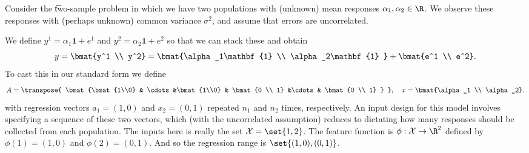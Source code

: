Consider the \t{two-sample problem} in which we have two populations with (unknown) mean responses $\alpha _1, \alpha _2 \in \R $.
We observe these responses with (perhaps unknown) common variance $\sigma ^2$, and assume that errors are uncorrelated.

We define $y^1 = \alpha _1\mathbf{1}  + e^1$ and $y^2 = \alpha _2\mathbf{1}  + e^2$ so that we can stack these and obtain
\[
y = \bmat{y^1 \\ y^2} = \bmat{\alpha _1\mathbf{1}  \\ \alpha _2\mathbf{1} } + \bmat{e^1 \\ e^2}.
\]
To cast this in our standard form we define
\[
A = \transpose{
\bmat{\bmat{1\\0} & \cdots &\bmat{1\\0} & \bmat{0 \\ 1} &\cdots & \bmat{0 \\ 1}
}
}, \quad x = \bmat{\alpha _1 \\ \alpha _2}.
\]
with regression vectors $a_1 = (1, 0)$ and $x_2 = (0, 1)$ repeated $n_1$ and $n_2$ times, respectively.
An input design for this model involves specifying a sequence of these two vectors, which (with the uncorrelated assumption) reduces to dictating how many responses should be collected from each population.
The inputs here is really the set $\mathcal{X}  = \set{1, 2}$.
The feature function is $\phi : \mathcal{X}  \to \R ^2$ defined by $\phi (1) = (1, 0)$ and $\phi (2) = (0, 1)$.
And so the regression range is $\set{(1, 0), (0, 1)}$.
